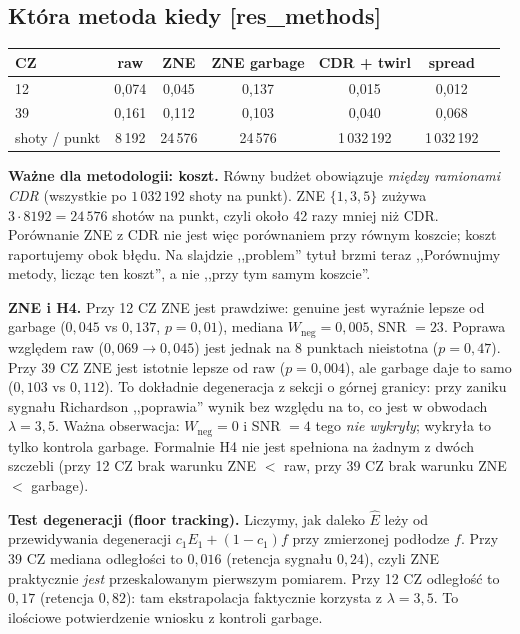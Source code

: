 \documentclass[11pt,a4paper]{article}
\newcommand{\slid}[1]{\hfill{\normalfont\small\ttfamily\color{axbluedk}[#1]}}
\begin{document}
\subsection{Która metoda kiedy \slid{res\_methods}}

\begin{center}
\begin{tabular}{@{}lcccccc@{}}
\toprule
CZ & raw & ZNE & ZNE garbage & CDR + twirl & spread \\
\midrule
12 & 0,074 & 0,045 & 0,137 & 0,015 & 0,012 \\
39 & 0,161 & 0,112 & 0,103 & 0,040 & 0,068 \\
shoty / punkt & 8\,192 & 24\,576 & 24\,576 & 1\,032\,192 & 1\,032\,192 \\
\bottomrule
\end{tabular}
\end{center}

\textbf{Ważne dla metodologii: koszt.} Równy budżet obowiązuje \emph{między ramionami CDR}
(wszystkie po $1\,032\,192$ shoty na punkt). ZNE $\{1,3,5\}$ zużywa $3\cdot8192=24\,576$ shotów na
punkt, czyli około 42 razy mniej niż CDR. Porównanie ZNE z CDR nie jest więc porównaniem przy
równym koszcie; koszt raportujemy obok błędu. Na slajdzie ,,problem'' tytuł brzmi teraz
,,Porównujmy metody, licząc ten koszt'', a nie ,,przy tym samym koszcie''.

\textbf{ZNE i H4.} Przy 12 CZ ZNE jest prawdziwe: genuine jest wyraźnie lepsze od garbage
($0{,}045$ vs $0{,}137$, $p=0{,}01$), mediana $W_{\text{neg}}=0{,}005$, SNR $=23$. Poprawa względem
raw ($0{,}069\to0{,}045$) jest jednak na 8 punktach nieistotna ($p=0{,}47$). Przy 39 CZ ZNE jest
istotnie lepsze od raw ($p=0{,}004$), ale garbage daje to samo ($0{,}103$ vs $0{,}112$). To dokładnie
degeneracja z sekcji o górnej granicy: przy zaniku sygnału Richardson ,,poprawia'' wynik bez względu
na to, co jest w obwodach $\lambda=3,5$. Ważna obserwacja: $W_{\text{neg}}=0$ i SNR $=4$ tego
\emph{nie wykryły}; wykryła to tylko kontrola garbage. Formalnie H4 nie jest spełniona na żadnym
z dwóch szczebli (przy 12 CZ brak warunku ZNE $<$ raw, przy 39 CZ brak warunku ZNE $<$ garbage).

\textbf{Test degeneracji (floor tracking).} Liczymy, jak daleko $\hat E$ leży od przewidywania
degeneracji $c_1E_1+(1-c_1)f$ przy zmierzonej podłodze $f$. Przy 39 CZ mediana odległości to
$0{,}016$ (retencja sygnału $0{,}24$), czyli ZNE praktycznie \emph{jest} przeskalowanym pierwszym
pomiarem. Przy 12 CZ odległość to $0{,}17$ (retencja $0{,}82$): tam ekstrapolacja faktycznie
korzysta z $\lambda=3,5$. To ilościowe potwierdzenie wniosku z kontroli garbage.
\end{document}
